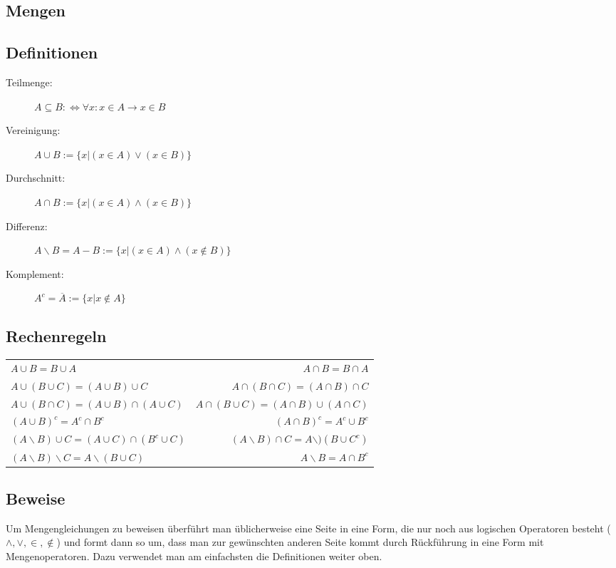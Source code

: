 \begin{multicols}{2}
\section{Mengen}

\subsection{Definitionen}
\begin{description}
	\item [Teilmenge:] $A \subseteq B :\Leftrightarrow \forall x: x \in A \rightarrow x \in B$
	\item [Vereinigung:] $A \cup B := \{x | (x \in A) \lor (x \in B)\}$
	\item [Durchschnitt:] $A \cap B := \{x | (x \in A) \land (x \in B)\}$
	\item [Differenz:] $A \backslash B = A - B := \{x | (x \in A) \land (x \not\in B)\}$
	\item [Komplement:] $A^c = \overline{A} := \{x | x \not\in A\}$
\end{description}

\subsection{Rechenregeln}
{\footnotesize
\begin{tabular}{|l|r|}\hline
$A \cup B = B \cup A$ & $A \cap B = B \cap A$\\
$A \cup (B \cup C) = (A \cup B) \cup C$ & $A \cap (B \cap C) = (A \cap B) \cap C$\\
$A \cup (B \cap C) = (A \cup B) \cap (A \cup C)$ & $A \cap (B \cup C) = (A \cap B) \cup (A \cap C)$\\
$(A \cup B)^c = A^c \cap B^c$ & $(A \cap B)^c = A^c \cup B^c$\\
$(A \backslash B) \cup C = (A \cup C) \cap (B^c \cup C)$ & $(A \backslash B) \cap C = A \backslash )(B \cup C^c)$\\
$(A \backslash B) \backslash C = A \backslash (B \cup C)$ & $A \backslash B = A \cap B^c$\\\hline
\end{tabular}
}

\subsection{Beweise}
Um Mengengleichungen zu beweisen überführt man üblicherweise eine Seite in eine Form,
die nur noch aus logischen Operatoren besteht ($\land, \lor, \in, \not\in$) und formt
dann so um, dass man zur gewünschten anderen Seite kommt durch Rückführung in eine
Form mit Mengenoperatoren. Dazu verwendet man am einfachsten die Definitionen weiter oben.


\end{multicols}
